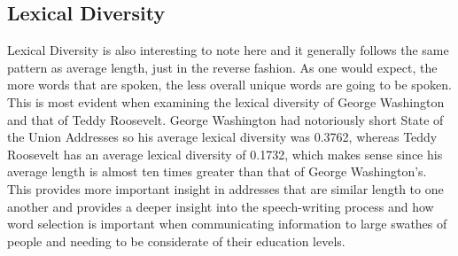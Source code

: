 \subsection{Lexical Diversity}
Lexical Diversity is also interesting to note here and it generally follows the same pattern as average length, just in the reverse fashion.
As one would expect, the more words that are spoken, the less overall unique words are going to be spoken.
This is most evident when examining the lexical diversity of George Washington and that of Teddy Roosevelt.
George Washington had notoriously short State of the Union Addresses so his average lexical diversity was 0.3762, whereas Teddy Roosevelt has an average lexical diversity of 0.1732, which makes sense since his average length is almost ten times greater than that of George Washington's.
This provides more important insight in addresses that are similar length to one another and provides a deeper insight into the speech-writing process and how word selection is important when communicating information to large swathes of people and needing to be considerate of their education levels.

